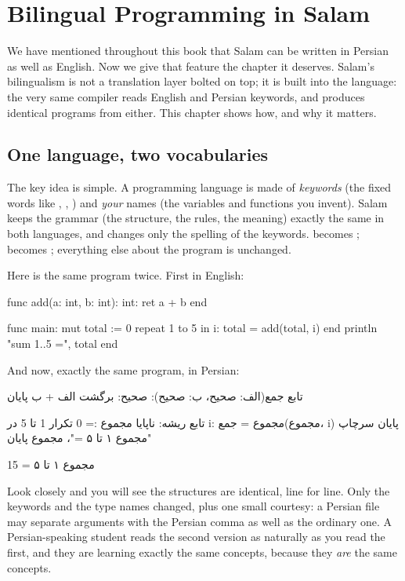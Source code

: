 \chapter{Bilingual Programming in Salam}%
\label{ch:bilingual}

We have mentioned throughout this book that Salam can be written in Persian as
well as English. Now we give that feature the chapter it deserves. Salam's
bilingualism is not a translation layer bolted on top; it is built into the
language: the very same compiler reads English and Persian keywords, and produces
identical programs from either. This chapter shows how, and why it matters.

\section{One language, two vocabularies}

The key idea is simple. A programming language is made of \emph{keywords} (the
fixed words like , , ) and \emph{your} names (the
variables and functions you invent). Salam keeps the grammar (the structure,
the rules, the meaning) exactly the same in both languages, and changes only the
spelling of the keywords.  becomes ;  becomes
; everything else about the program is unchanged.

Here is the same program twice. First in English:

\begin{salamen}
func add(a: int, b: int): int:
    ret a + b
end

func main:
    mut total := 0
    repeat 1 to 5 in i:
        total = add(total, i)
    end
    println "sum 1..5 =", total
end
\end{salamen}

And now, exactly the same program, in Persian:

\begin{salamfa}
تابع جمع(الف: صحیح، ب: صحیح): صحیح:
    برگشت الف + ب
پایان

تابع ریشه:
    ناپایا مجموع := 0
    تکرار 1 تا 5 در i:
        مجموع = جمع(مجموع، i)
    پایان
    سرچاپ "مجموع ۱ تا ۵ ="، مجموع
پایان
\end{salamfa}

\begin{progout}
مجموع ۱ تا ۵ = 15
\end{progout}

Look closely and you will see the structures are identical, line for line. Only
the keywords and the type names changed, plus one small courtesy: a Persian file
may separate arguments with the Persian comma  as well as the ordinary
one. A Persian-speaking student reads the
second version as naturally as you read the first, and they are learning exactly
the same concepts, because they \emph{are} the same concepts.

